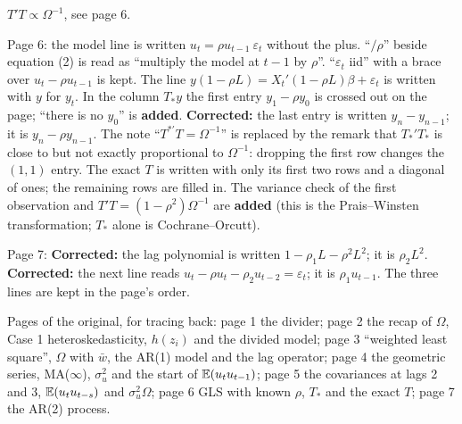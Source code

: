 \documentclass[11pt]{article}
\begin{document}
\begin{transcriptnotes}
        $T'T \propto \Omega^{-1}$, see page 6.
  \item Page 6: the model line is written $u_{t} = \rho u_{t-1}\ \varepsilon_{t}$
        without the plus. ``$/\rho$'' beside equation (2) is read as ``multiply the
        model at $t-1$ by $\rho$''. ``$\varepsilon_{t}$ iid'' with a brace over
        $u_{t} - \rho u_{t-1}$ is kept. The line $y(1-\rho L) = X_{t}'(1-\rho L)\beta
        + \varepsilon_{t}$ is written with $y$ for $y_{t}$. In the column
        $T_{*}y$ the first entry $y_{1} - \rho y_{0}$ is crossed out on the page;
        ``there is no $y_{0}$'' is \textbf{added}. \textbf{Corrected:} the last entry
        is written $y_{n} - y_{n-1}$; it is $y_{n} - \rho y_{n-1}$. The note
        ``$T^{*\prime}T = \Omega^{-1}$'' is replaced by the remark that $T_{*}'T_{*}$ is close to but
        not exactly proportional to $\Omega^{-1}$: dropping the first row changes the
        $(1,1)$ entry.
        The exact $T$ is written with only its first two rows and a diagonal of
        ones; the remaining rows are filled in. The variance check of the first
        observation and $T'T = (1-\rho^{2})\Omega^{-1}$ are \textbf{added} (this is
        the Prais--Winsten transformation; $T_{*}$ alone is Cochrane--Orcutt).
  \item Page 7: \textbf{Corrected:} the lag polynomial is written
        $1 - \rho_{1}L - \rho^{2}L^{2}$; it is $\rho_{2}L^{2}$. \textbf{Corrected:}
        the next line reads $u_{t} - \rho u_{t} - \rho_{2}u_{t-2} = \varepsilon_{t}$;
        it is $\rho_{1}u_{t-1}$. The three lines are kept in the page's order.
  \item Pages of the original, for tracing back: page 1 the divider; page 2 the recap
        of $\Omega$, Case 1 heteroskedasticity, $h(z_{i})$ and the divided model;
        page 3 ``weighted least square'', $\Omega$ with $\bar w$, the AR(1) model and
        the lag operator; page 4 the geometric series, MA($\infty$),
        $\sigma_{u}^{2}$ and the start of $\mathbb{E}(u_{t}u_{t-1})$; page 5 the covariances
        at lags 2 and 3, $\mathbb{E}(u_{t}u_{t-s})$ and $\sigma_{u}^{2}\Omega$; page 6 GLS
        with known $\rho$, $T_{*}$ and the exact $T$; page 7 the AR(2) process.
\end{transcriptnotes}
\end{document}
